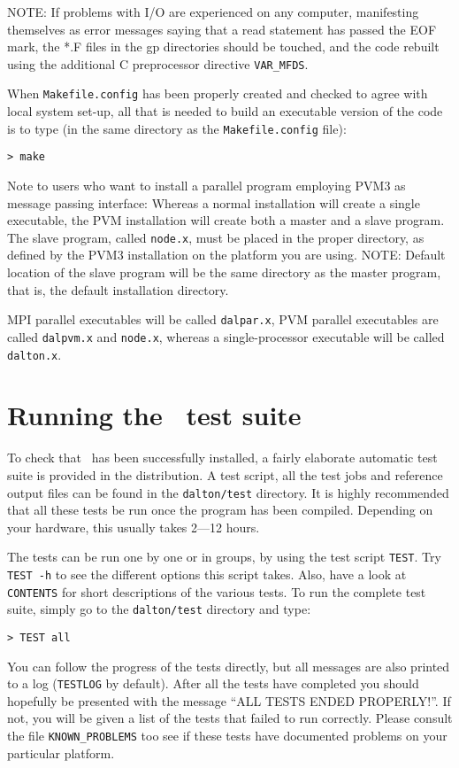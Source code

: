 NOTE: If problems with I/O are experienced on
any computer,
manifesting themselves as error messages saying that a read statement
has passed the EOF mark, the *.F files in the gp directories should be
touched, and the code rebuilt using the additional C preprocessor
directive \verb|VAR_MFDS|.

When  \verb|Makefile.config| has been properly
created and checked
to agree with local system set-up, all that is needed
to build an executable version of the
code is to type
(in the same directory as the \verb|Makefile.config| file):
\begin{verbatim}
> make
\end{verbatim}
Note to users who want to install a parallel program employing PVM3
as message passing interface: Whereas a normal installation will
create a single executable, the PVM installation will
create both a master and a slave
program.
The slave program, called \verb|node.x|, must be placed in  the
proper directory, as defined by the PVM3 installation on the
platform you are using. NOTE: Default location of the slave program
will be the same directory as the master program, that is, the default
installation directory.

MPI parallel executables will be called \verb|dalpar.x|, PVM parallel
executables are called \verb|dalpvm.x| and \verb|node.x|, whereas a
single-processor executable will be called \verb|dalton.x|.

\section{Running the \dalton\ test
suite}\label{sec:testsuite}

To check that \dalton\ has been successfully installed, a fairly
elaborate automatic test suite is provided in the distribution. A test
script, all the test jobs and reference output files can be found in
the \verb|dalton/test| directory. It is highly recommended that all
these tests be run once the program has been compiled. Depending on
your hardware, this usually takes 2---12 hours.

The tests can be run one by one or in groups, by using the test script
\verb|TEST|. Try \verb|TEST -h| to see the different options this
script takes. Also, have a look at \verb|CONTENTS|
for short descriptions of the various tests. To run the
complete test suite, simply go to the \verb|dalton/test| directory and
type:
\begin{verbatim}
> TEST all
\end{verbatim}
You can follow the progress of the tests directly, but all messages
are also printed to a log (\verb|TESTLOG| by default). After all the
tests have completed you should hopefully be presented with the
message ``ALL TESTS ENDED PROPERLY!''. If not, you will be given a
list of the tests that failed to run correctly. Please consult the file
\verb|KNOWN_PROBLEMS| too see if these tests have documented problems
on your particular platform.


